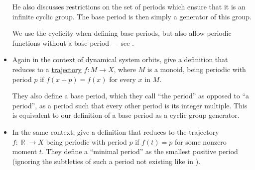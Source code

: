 \begin{remark}
\begin{itemize}
    He also discusses restrictions on the set of periods which ensure that it is an infinite cyclic group. The base period is then simply a generator of this group.

    We use the cyclicity when defining base periods, but also allow periodic functions without a base period --- see .

    \item Again in the context of dynamical system orbits,  give a definition that reduces to a \hyperref[def:dynamical_system_trajectory]{trajectory} \( f: M \to X \), where \( M \) is a monoid, being periodic with period \( p \) if \( f(x + p) = f(x) \) for every \( x \) in \( M \).

    They also define a base period, which they call \enquote{the period} as opposed to \enquote{a period}, as a period such that every other period is its integer multiple. This is equivalent to our definition of a base period as a cyclic group generator.

    \item In the same context,  give a definition that reduces to the trajectory \( f: \BbbR \to X \) being periodic with period \( p \) if \( f(t) = p \) for some nonzero moment \( t \). They define a \enquote{minimal period} as the smallest positive period (ignoring the subtleties of such a period not existing like in ).
  \end{itemize}
\end{remark}


